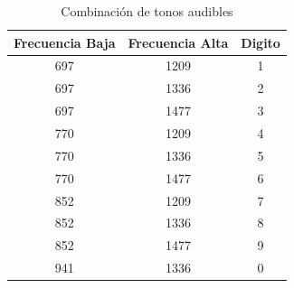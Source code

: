 \begin{table}[htbp]
  \centering
  \label{tab:combinacion_tonos}
  \begin{tabular}{|c|c|c|}
    \hline
    \textbf{Frecuencia Baja} & \textbf{Frecuencia Alta} & \textbf{Digito} \\
    \hline
    697                      & 1209                     & 1               \\ \hline
    697                      & 1336                     & 2               \\ \hline
    697                      & 1477                     & 3               \\ \hline
    770                      & 1209                     & 4               \\ \hline
    770                      & 1336                     & 5               \\ \hline
    770                      & 1477                     & 6               \\ \hline
    852                      & 1209                     & 7               \\ \hline
    852                      & 1336                     & 8               \\ \hline
    852                      & 1477                     & 9               \\ \hline
    941                      & 1336                     & 0               \\
    \hline
  \end{tabular}
  \caption{Combinación de tonos audibles}
\end{table}

